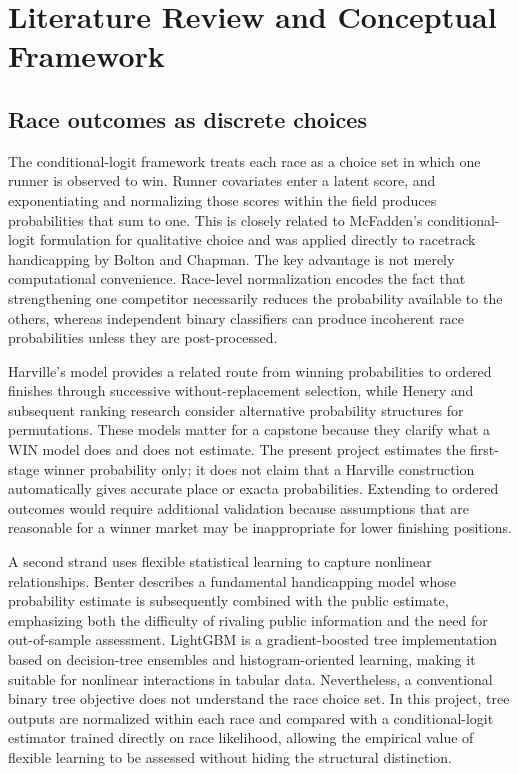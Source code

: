 \section{Literature Review and Conceptual Framework}\label{sec:literature}

\subsection{Race outcomes as discrete choices}\label{sec:lit-logit}
The conditional-logit framework treats each race as a choice set in which one runner is observed to win. Runner covariates enter a latent score, and exponentiating and normalizing those scores within the field produces probabilities that sum to one. This is closely related to McFadden's conditional-logit formulation for qualitative choice and was applied directly to racetrack handicapping by Bolton and Chapman\cite{mcfadden1974,bolton1986}. The key advantage is not merely computational convenience. Race-level normalization encodes the fact that strengthening one competitor necessarily reduces the probability available to the others, whereas independent binary classifiers can produce incoherent race probabilities unless they are post-processed.

Harville's model provides a related route from winning probabilities to ordered finishes through successive without-replacement selection, while Henery and subsequent ranking research consider alternative probability structures for permutations\cite{harville1973,henery1981}. These models matter for a capstone because they clarify what a WIN model does and does not estimate. The present project estimates the first-stage winner probability only; it does not claim that a Harville construction automatically gives accurate place or exacta probabilities. Extending to ordered outcomes would require additional validation because assumptions that are reasonable for a winner market may be inappropriate for lower finishing positions.

A second strand uses flexible statistical learning to capture nonlinear relationships. Benter describes a fundamental handicapping model whose probability estimate is subsequently combined with the public estimate, emphasizing both the difficulty of rivaling public information and the need for out-of-sample assessment\cite{benter1994}. LightGBM is a gradient-boosted tree implementation based on decision-tree ensembles and histogram-oriented learning, making it suitable for nonlinear interactions in tabular data\cite{ke2017lightgbm}. Nevertheless, a conventional binary tree objective does not understand the race choice set. In this project, tree outputs are normalized within each race and compared with a conditional-logit estimator trained directly on race likelihood, allowing the empirical value of flexible learning to be assessed without hiding the structural distinction.

